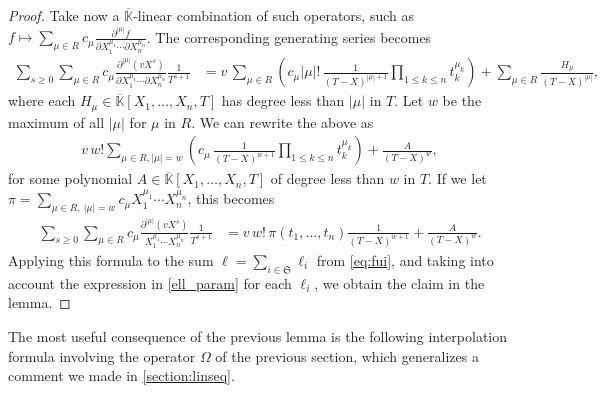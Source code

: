 \documentclass[12pt]{article}
\newcommand{\lf}{X}
\def\Kbar {{\ensuremath{\overline{\mathbb{K}}}}}
\begin{document}
\begin{proof}
  Take now a $\Kbar$-linear combination of such operators, such as $f \mapsto
  \sum_{\mu \in R} c_\mu \frac{ \partial^{|\mu|} f } {\partial
    X_1^{\mu_1} \cdots \partial X_n^{\mu_n}}$. The corresponding
  generating series becomes
  \begin{align*}
    \sum_{s \ge 0} \sum_{\mu \in R} c_\mu \frac{ \partial^{|\mu|} ( v
      \lf^s )} {\partial X_1^{\mu_1} \cdots \partial X_n^{\mu_n}}
    \frac{1}{T^{s+1}} &= v\,\sum_{\mu \in R} \left( c_\mu |\mu|!\,  \frac {1}{(T-\lf )^{|\mu|+1}} \prod_{1
      \le k \le n} t_k^{\mu_k} \right )+\sum_{\mu
      \in R} \frac{H_\mu}{(T-\lf)^{|\mu|}},
  \end{align*}
  where each $H_\mu \in \Kbar[X_1,\dots,X_n,T]$ has degree less than
  $|\mu|$ in $T$.  Let $w$ be the maximum of all $|\mu|$ for $\mu$ in
  $R$. We can rewrite the above as
  \begin{align*}
    v\, w! 
    \sum_{\mu \in R, |\mu|=w}\left ( c_\mu
    \,    \frac {1}{(T-\lf )^{w+1}} \prod_{1 \le k \le n} 
    t_k^{\mu_k}\right )
	+ \frac{A}{(T-\lf )^{w}},
  \end{align*}
  for some polynomial $A \in \Kbar[X_1,\dots,X_n,T]$ of degree less than $w$ in $T$. If we let 
  $\pi =\sum_{\mu \in R,\ |\mu|=w} c_{\mu} X_1^{\mu_1} \cdots
  X_n^{\mu_n}$, this becomes
  \begin{align*}
    \sum_{s \ge 0} 
    \sum_{\mu \in R} c_\mu \frac{ \partial^{|\mu|} ( v \lf^s )} { X_1^{\mu_1} \cdots
      X_n^{\mu_n}}
    \frac{1}{T^{s+1}} 
    &=
    v\, w! \,  \pi(t_1,\dots,t_n)
    \frac {1}{(T-\lf )^{w+1}}
    + \frac{A}{(T-\lf )^{w}}.
  \end{align*}
  Applying this formula to the sum $\ell=\sum_{i \in
    \mathfrak{S}}\ell_i$ from \cref{eq:fui}, and taking into account
  the expression in \cref{ell_param} for each $\ell_i$, we obtain the
  claim in the lemma.
\end{proof}

\noindent 
The most useful consequence of the previous lemma is the following
interpolation formula involving the operator $\Omega$ of the previous
section, which generalizes a comment we made in \cref{section:linseq}.
\end{document}
